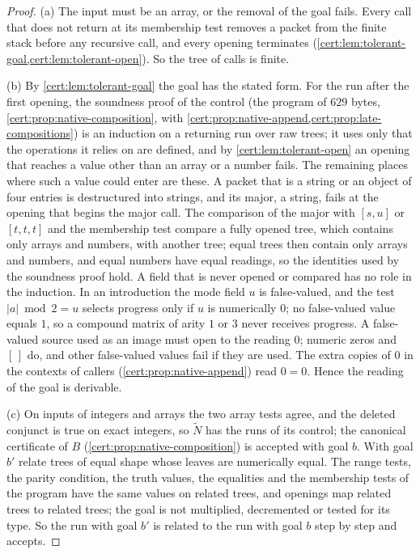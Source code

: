 \begin{proof}
(a) The input must be an array, or the removal of the goal fails. Every call
that does not return at its membership test removes a packet from the finite
stack before any recursive call, and every opening terminates
(\cref{cert:lem:tolerant-goal,cert:lem:tolerant-open}). So the tree of calls is
finite.

(b) By \cref{cert:lem:tolerant-goal} the goal has the stated form. For the run
after the first opening, the soundness proof of the control (the program of
$629$ bytes, \cref{cert:prop:native-composition}, with
\cref{cert:prop:native-append,cert:prop:late-compositions}) is an induction on a
returning run over raw trees; it uses only that the operations it relies on are
defined, and by \cref{cert:lem:tolerant-open} an opening that reaches a value
other than an array or a number fails. The remaining places where such a value
could enter are these. A packet that is a string or an object of four entries
is destructured into strings, and its major, a string, fails at the opening that
begins the major call. The comparison of the major with $[s,u]$ or $[t,t,t]$ and
the membership test compare a fully opened tree, which contains only arrays and
numbers, with another tree; equal trees then contain only arrays and numbers,
and equal numbers have equal readings, so the identities used by the soundness
proof hold. A field that is never opened or compared has no role in the
induction. In an introduction the mode field $u$ is false-valued, and the test
$\lvert a\rvert\bmod 2=u$ selects progress only if $u$ is numerically $0$; no
false-valued value equals $1$, so a compound matrix of arity $1$ or $3$ never
receives progress. A false-valued source used as an image must open to the
reading $0$; numeric zeros and $[\,]$ do, and other false-valued values fail if
they are used. The extra copies of $0$ in the contexts of callers
(\cref{cert:prop:native-append}) read $0=0$. Hence the reading of the goal is
derivable.

(c) On inputs of integers and arrays the two array tests agree, and the deleted
conjunct is true on exact integers, so $\widetilde N$ has the runs of its
control; the canonical certificate of $B$ (\cref{cert:prop:native-composition})
is accepted with goal $b$. With goal $b'$ relate trees of equal shape whose
leaves are numerically equal. The range tests, the parity condition, the truth
values, the equalities and the membership tests of the program have the same
values on related trees, and openings map related trees to related trees; the
goal is not multiplied, decremented or tested for its type. So the run with
goal $b'$ is related to the run with goal $b$ step by step and accepts.
\end{proof}

